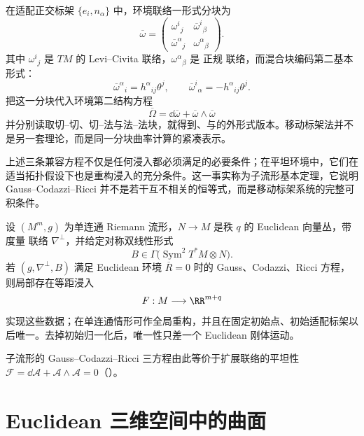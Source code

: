 在适配正交标架 $\{e_i,n_\alpha\}$ 中，环境联络一形式分块为
\[
\overline\omega
=
\begin{pmatrix}
\omega^i{}_j & \overline\omega^i{}_\beta\\
\overline\omega^\alpha{}_j & \omega^\alpha{}_\beta
\end{pmatrix}.
\]
其中 $\omega^i{}_j$ 是 $TM$ 的 Levi--Civita 联络，$\omega^\alpha{}_\beta$ 是 正规 联络，而混合块编码第二基本形式：
\begin{equation}\label{eq:math-dg-moving-frame-second-form}
\overline\omega^\alpha{}_i
=h^\alpha{}_{ij}\theta^j,
\qquad
\overline\omega^i{}_\alpha
=-h^\alpha{}_{ij}\theta^j.
\end{equation}
把这一分块代入环境第二结构方程
\[
\overline\Omega
=\dd\overline\omega+\overline\omega\wedge\overline\omega
\]
并分别读取切--切、切--法与法--法块，就得到、与的外形式版本。移动标架法并不是另一套理论，而是同一分块曲率计算的紧凑表示。

上述三条兼容方程不仅是任何浸入都必须满足的必要条件；在平坦环境中，它们在适当拓扑假设下也是重构浸入的充分条件。这一事实称为子流形基本定理，它说明 Gauss--Codazzi--Ricci 并不是若干互不相关的恒等式，而是移动标架系统的完整可积条件。

设 $(M^m,g)$ 为单连通 Riemann 流形，$N\to M$ 是秩 $q$ 的 Euclidean 向量丛，带 度量 联络 $\nabla^\perp$，并给定对称双线性形式
\[
B\in\Gamma\bigl(\operatorname{Sym}^2T^*M\otimes N\bigr).
\]
若 $(g,\nabla^\perp,B)$ 满足 Euclidean 环境 $\overline R=0$ 时的 Gauss、Codazzi、Ricci 方程，则局部存在等距浸入
\[
F:M\longrightarrow\RR^{m+q}
\]
实现这些数据；在单连通情形可作全局重构，并且在固定初始点、初始适配标架以后唯一。去掉初始归一化后，唯一性只差一个 Euclidean 刚体运动。

子流形的 Gauss--Codazzi--Ricci 三方程由此等价于扩展联络的平坦性 $\mathcal F=\dd\mathcal A+\mathcal A\wedge\mathcal A=0$（）。

\section{Euclidean 三维空间中的曲面}

